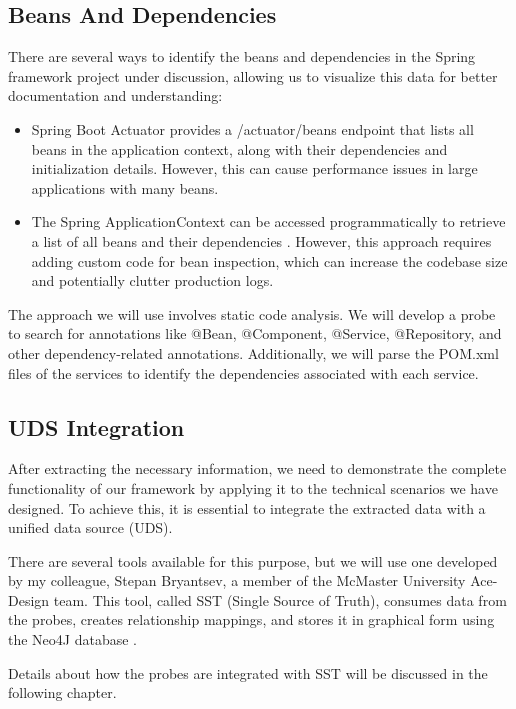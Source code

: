 \subsection{Beans And Dependencies}

There are several ways to identify the beans and dependencies in the Spring framework project under discussion, allowing us to visualize this data for better documentation and understanding:

\begin{itemize}
    \item Spring Boot Actuator provides a /actuator/beans endpoint that lists all beans in the application context, along with their dependencies and initialization details. However, this can cause performance issues in large applications with many beans.
    \item The Spring ApplicationContext can be accessed programmatically to retrieve a list of all beans and their dependencies \citep{baeldung_applicationcontext}. However, this approach requires adding custom code for bean inspection, which can increase the codebase size and potentially clutter production logs.
\end{itemize}

The approach we will use involves static code analysis. We will develop a probe to search for annotations like @Bean, @Component, @Service, @Repository, and other dependency-related annotations. Additionally, we will parse the POM.xml files of the services to identify the dependencies associated with each service.

\subsection{UDS Integration}

After extracting the necessary information, we need to demonstrate the complete functionality of our framework by applying it to the technical scenarios we have designed. To achieve this, it is essential to integrate the extracted data with a unified data source (UDS).

There are several tools available for this purpose, but we will use one developed by my colleague, Stepan Bryantsev, a member of the McMaster University Ace-Design team. This tool, called SST (Single Source of Truth), consumes data from the probes, creates relationship mappings, and stores it in graphical form using the Neo4J database \citep{neo4j}.

Details about how the probes are integrated with SST will be discussed in the following chapter.

